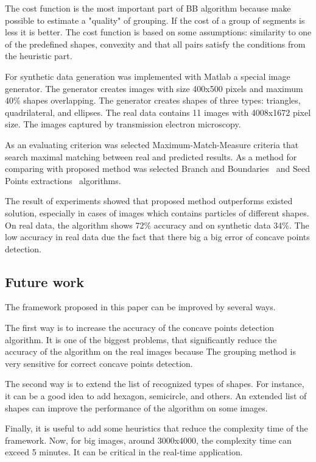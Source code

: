 \documentclass{lutmscthesis}[2010/09/22]
\begin{document}
The cost function is the most important part of BB algorithm because make possible to estimate a "quality" of grouping. If the cost of a group of segments is less it is better. The cost function is based on some assumptions: similarity to one of the predefined shapes, convexity and that all pairs satisfy the conditions from the heuristic part.

For synthetic data generation was implemented with Matlab a special image generator. The generator creates images with size 400x500 pixels and maximum 40\% shapes overlapping. The generator creates shapes of three types: triangles, quadrilateral, and ellipses. The real data contains 11 images with 4008x1672 pixel size. The images captured by transmission electron microscopy.

As an evaluating criterion was selected Maximum-Match-Measure criteria that search maximal matching between real and predicted results. As a method for comparing with proposed method was selected Branch and Boundaries~\cite{zafari-bb} and Seed Points extractions~\cite{Zafari15} algorithms.

The result of experiments showed that proposed method outperforms existed solution, especially in cases of images which contains particles of different shapes. On real data, the algorithm shows 72\% accuracy and on synthetic data 34\%. The low accuracy in real data due the fact that there big a big error of concave points detection. 

\subsection{Future work}

The framework proposed in this paper can be improved by several ways.

The first way is to increase the accuracy of the concave points detection algorithm. It is one of the biggest problems, that significantly reduce the accuracy of the algorithm on the real images because The grouping method is very sensitive for correct concave points detection.

The second way is to extend the list of recognized types of shapes. For instance, it can be a good idea to add hexagon, semicircle, and others. An extended list of shapes can improve the performance of the algorithm on some images.

Finally, it is useful to add some heuristics that reduce the complexity time of the framework. Now, for big images, around 3000x4000, the complexity time can exceed 5 minutes. It can be critical in the real-time application.
\end{document}
